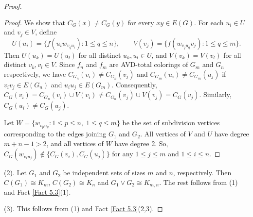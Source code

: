 \documentclass[12pt,reqno,a4paper]{amsart}
\theoremstyle{definition}
\theoremstyle{plain}
\begin{document}
\begin{proof}
\begin{proof}
We show that $C_G(x)\neq C_G(y)$ for every $xy\in E(G)$. For each $u_i\in U$ and $v_j\in V$, define
\[
U(u_i)=\{f(u_iw_{v_qu_i}) : 1\le q\le n\},\qquad
V(v_j)=\{f(w_{v_ju_q}v_j) : 1\le q\le m\}.
\]
Then $U(u_k)=U(u_l)$ for all distinct $u_k,u_l\in U$, and $V(v_k)=V(v_l)$ for all distinct $v_k,v_l\in V$.
Since $f_{n}$ and $f_{m}$ are AVD-total colorings of $G_{m}$ and $G_{n}$ respectively, we have $C_{G_{n}}(v_{i})\neq C_{G_{n}}(v_{j})$ and $C_{G_{m}}(u_{i})\neq C_{G_{m}}(u_{j})$ if $v_{i} v_{j}\in E(G_{n})$ and $u_{i} u_{j}\in E(G_{m})$. Consequently, $C_{G}(v_{i})=C_{G_{n}}(v_{i}) \cup V(v_{i})\neq C_{G_{n}}(v_{j})\cup V(v_{j})=C_{G}(v_{j})$. Similarly, $C_{G}(u_{i})\neq C_{G}(u_{j})$.

Let $W=\{w_{v_pu_q}: 1\leq p\leq n,\; 1\leq q\leq m\}$ be the set of subdivision vertices corresponding to the edges joining $G_1$ and $G_2$. All vertices of $V$ and $U$ have degree $m+n-1> 2$, and all vertices of $W$ have degree 2. So, $C_{G}(w_{v_{i}u_{j}})\not\in \{C_{G}(v_{i}),C_{G}(u_{j})\}$ for any $1\leq j\leq m$ and $1\leq i \leq n$.
\end{proof}

(2). Let $G_{1}$ and $G_{2}$ be independent sets of sizes $m$ and $n$, respectively. Then $C(G_{1})\cong K_{m}$, $C(G_{2})\cong K_{n}$ and $G_{1} \vee G_{2}\cong K_{m,n}$. The rest follows from (1) and Fact \ref{Fact 5.3}(1).

(3). This follows from (1) and Fact \ref{Fact 5.3}(2,3).


\end{proof}
\end{document}
